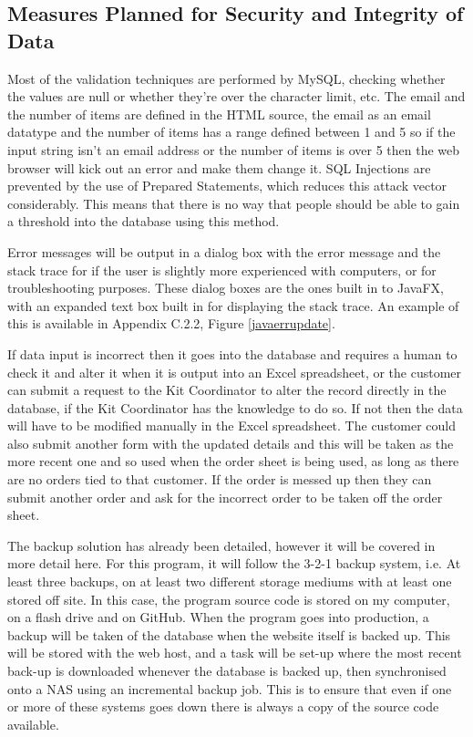 \documentclass[
11pt, %
a4paper, %
oneside, %
headinclude,footinclude, %
BCOR5mm, %
]{scrartcl}
\begin{document}
\subsection{Measures Planned for Security and Integrity of Data}
Most of the validation techniques are performed by MySQL, checking whether the values are null or whether they're over the character limit, etc. The email and the number of items are defined in the HTML source, the email as an email datatype and the number of items has a range defined between 1 and 5 so if the input string isn't an email address or the number of items is over 5 then the web browser will kick out an error and make them change it. SQL Injections are prevented by the use of Prepared Statements, which reduces this attack vector considerably. This means that there is no way that people should be able to gain a threshold into the database using this method. \par Error messages will be output in a dialog box with the error message and the stack trace for if the user is slightly more experienced with computers, or for troubleshooting purposes. These dialog boxes are the ones built in to JavaFX, with an expanded text box built in for displaying the stack trace. An example of this is available in Appendix C.2.2, Figure \ref{javaerrupdate}. \par If data input is incorrect then it goes into the database and requires a human to check it and alter it when it is output into an Excel spreadsheet, or the customer can submit a request to the Kit Coordinator to alter the record directly in the database, if the Kit Coordinator has the knowledge to do so. If not then the data will have to be modified manually in the Excel spreadsheet. The customer could also submit another form with the updated details and this will be taken as the more recent one and so used when the order sheet is being used, as long as there are no orders tied to that customer. If the order is messed up then they can submit another order and ask for the incorrect order to be taken off the order sheet. \par The backup solution has already been detailed, however it will be covered in more detail here. For this program, it will follow the 3-2-1 backup system, i.e. At least three backups, on at least two different storage mediums with at least one stored off site. In this case, the program source code is stored on my computer, on a flash drive and on GitHub. When the program goes into production, a backup will be taken of the database when the website itself is backed up. This will be stored with the web host, and a task will be set-up where the most recent back-up is downloaded whenever the database is backed up, then synchronised onto a NAS using an incremental backup job. This is to ensure that even if one or more of these systems goes down there is always a copy of the source code available. 
\end{document}
